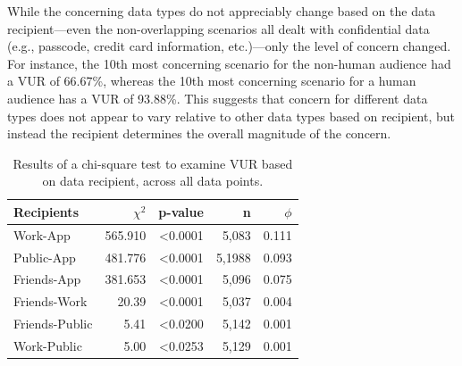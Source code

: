 \documentclass{acm_proc_article-sp}
\begin{document}
While the concerning data types do not appreciably change based on the data recipient---even the non-overlapping scenarios all dealt with confidential data (e.g., passcode, credit card information, etc.)---only the level of concern changed. For instance, the 10th most concerning scenario for the non-human audience had a VUR of 66.67\%, whereas the 10th most concerning scenario for a human audience has a VUR of 93.88\%. This suggests that concern for different data types does not appear to vary relative to other data types based on recipient, but instead the recipient determines the overall magnitude of the concern.



\begin{table}[t]
\begin{center}
\begin{tabular}{|l|r|r|r|r|}
\hline
Recipients	& $\chi^2$ & p-value 	& n & $\phi$ \\
\hline
Work-App	& 565.910 & <0.0001 & 5,083 & 0.111\\
Public-App	& 481.776 & <0.0001 & 5,1988& 0.093\\
Friends-App & 381.653 & <0.0001 & 5,096 & 0.075\\
Friends-Work & 20.39 & <0.0001 & 5,037 & 0.004\\
Friends-Public & 5.41 & <0.0200 & 5,142 & 0.001\\
Work-Public&  5.00 & <0.0253 & 5,129	& 0.001\\
\hline
\end{tabular}
\caption{Results of a chi-square test to examine VUR based on data recipient, across all data points.}
\label{recipient}
\end{center}
\end{table}
\end{document}
